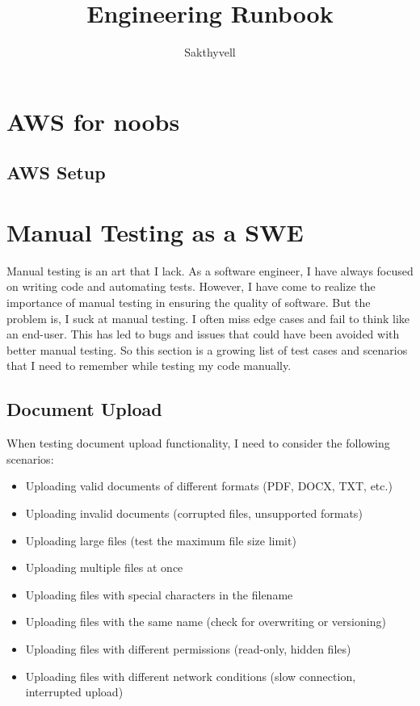 \documentclass[11pt]{article}
\title{Engineering Runbook}
\author{Sakthyvell}
\begin{document}
\maketitle
\tableofcontents

\section{AWS for noobs}

\subsection{AWS Setup}



\section{Manual Testing as a SWE}
Manual testing is an art that I lack. As a software engineer, I have always focused on writing code and automating tests. However, I have come to realize the importance of manual testing in ensuring the quality of software. But the problem is, I suck at manual testing. I often miss edge cases and fail to think like an end-user. This has led to bugs and issues that could have been avoided with better manual testing. So this section is a growing list of test cases and scenarios that I need to remember while testing my code manually.

\subsection{Document Upload}
When testing document upload functionality, I need to consider the following scenarios:
\begin{itemize}
    \item Uploading valid documents of different formats (PDF, DOCX, TXT, etc.)
    \item Uploading invalid documents (corrupted files, unsupported formats)
    \item Uploading large files (test the maximum file size limit)
    \item Uploading multiple files at once
    \item Uploading files with special characters in the filename
    \item Uploading files with the same name (check for overwriting or versioning)
    \item Uploading files with different permissions (read-only, hidden files)
    \item Uploading files with different network conditions (slow connection, interrupted upload)
\end{itemize}
\end{document}
